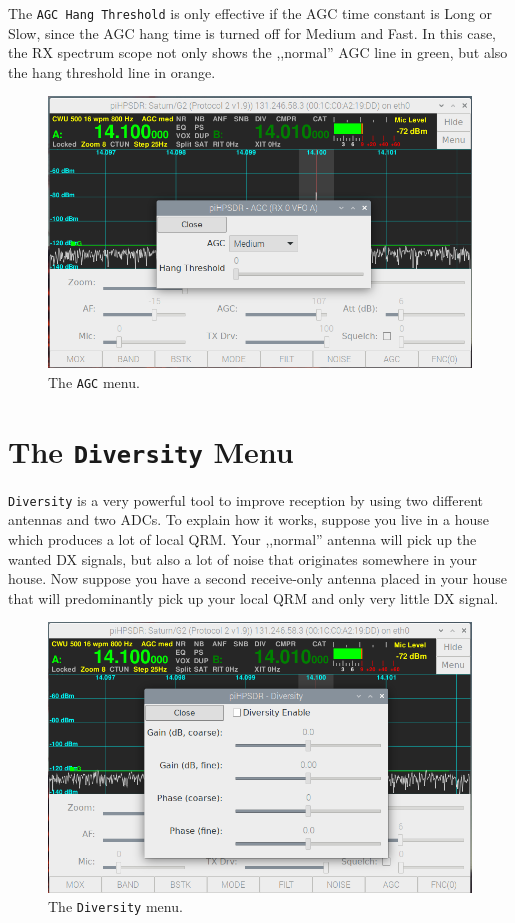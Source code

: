 \documentclass[12pt]{book}
\def\rett#1{\texttt{\color{red}#1}}
\def\bltt#1{\texttt{\color{blue}#1}}
\begin{document}
The \rett{AGC Hang Threshold} is only effective if the AGC time constant is Long or Slow,
since the AGC hang time is turned off for Medium and Fast.
In this case, the RX spectrum scope not only shows the ,,normal'' AGC line in green,
but also the hang threshold line in orange.

\begin{figure}[ht]
\center
\includegraphics[width=12cm]{AGCMenu.png}
\caption{The \bltt{AGC} menu.}
\label{fig:AGCMenu}
\end{figure}

\section{The \texttt{Diversity} Menu}

\bltt{Diversity} is a very powerful tool to improve reception by using two different
antennas and two ADCs. To explain how it works, suppose you live in a house which produces
a lot of local QRM. Your ,,normal'' antenna will pick up the wanted DX signals, but also
a lot of noise that originates somewhere in your house. Now suppose you have a second
receive-only antenna placed in your house that will predominantly pick up your local
QRM and only very little DX signal.

\begin{figure}[ht]
\center
\includegraphics[width=12cm]{DiversityMenu.png}
\caption{The \bltt{Diversity} menu.}
\label{fig:DiversityMenu}
\end{figure}
\end{document}

